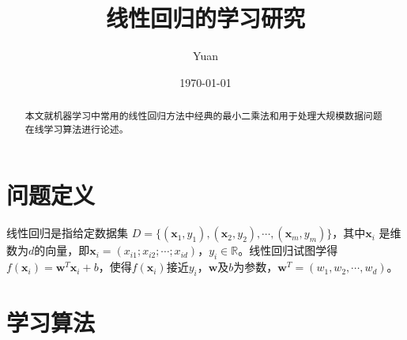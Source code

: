 \documentclass[12pt,a4paper,draft]{ctexart}
\title{线性回归的学习研究}
\author{Yuan}
\date{\small\today}
\begin{document}
\maketitle
\begin{abstract}
本文就机器学习中常用的线性回归方法中经典的最小二乘法和用于处理大规模数据问题在线学习算法进行论述。
\end{abstract}	
\section{问题定义}
线性回归是指给定数据集 $ D=\{(\bm{x}_{1},y_{1}),(\bm{x}_{2},y_{2}),\cdots,(\bm{x}_{m},y_{m})\} $，其中$\bm{x}_i$ 是维数为$ d $的向量，即$\bm{x}_i=(x_{i1};x_{i2};\cdots;x_{id})$，$y_{i}\in\mathbb{R} $。线性回归试图学得$f(\bm{x}_{i})=\bm{w}^T\bm{x}_{i}+b$，使得$f(\bm{x}_{i})$接近$ y_{i}$，$\bm{w}$及$b$为参数，$\bm{w}^T=(w_1,w_2,\cdots,w_d)$。
\section{学习算法}
\end{document}
